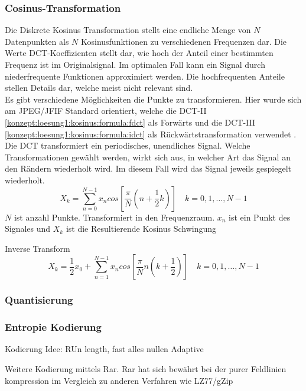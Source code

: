 \subsubsection{Cosinus-Transformation} \label{konzept:loesung1:kosinus}
Die Diskrete Kosinus Transformation stellt eine endliche Menge von $N$ Datenpunkten als $N$ Kosinusfunktionen zu verschiedenen Frequenzen dar. Die Werte DCT-Koeffizienten stellt dar, wie hoch der Anteil einer bestimmten Frequenz ist im Originalsignal. Im optimalen Fall kann ein Signal durch niederfrequente Funktionen approximiert werden. Die hochfrequenten Anteile stellen Details dar, welche meist nicht relevant sind.\\
Es gibt verschiedene Möglichkeiten die Punkte zu transformieren. Hier wurde sich am JPEG/JFIF Standard orientiert, welche die DCT-II \eqref{konzept:loesung1:kosinus:formula:fdct} als Forwärts und die DCT-III \eqref{konzept:loesung1:kosinus:formula:idct} als Rückwärtstransformation verwendet \cite{wallace1992jpeg}. Die DCT transformiert ein periodisches, unendliches Signal. Welche Transformationen gewählt werden, wirkt sich aus, in welcher Art das Signal an den Rändern wiederholt wird. Im diesem Fall wird das Signal jeweils gespiegelt wiederholt.
\begin{equation} \label{konzept:loesung1:kosinus:formula:fdct}
	X_k = \sum_{n=0}^{N-1}x_n cos[\frac{\pi}{N}(n+\frac{1}{2}k)] \quad k = 0, 1, \ldots, N-1
\end{equation}
$N$ ist anzahl Punkte. Transformiert in den Frequenzraum. $x_n$ ist ein Punkt des Signales und $X_k$ ist die Resultierende Kosinus Schwingung%

Inverse Transform
\begin{equation} \label{konzept:loesung1:kosinus:formula:idct}
X_k  = \frac{1}{2}x_0 + \sum_{n=1}^{N-1}x_n cos[\frac{\pi}{N}n(k+\frac{1}{2})] \quad k  = 0,1,\ldots,N-1
\end{equation}

\subsubsection{Quantisierung}


\subsubsection{Entropie Kodierung}\label{konzept:loesung1:kodierung}
Kodierung
	Idee: RUn length, fast alles nullen
	Adaptive

	Weitere Kodierung mittels Rar.
		Rar hat sich bewährt bei der purer Feldlinien kompression im Vergleich zu anderen Verfahren wie LZ77/gZip





